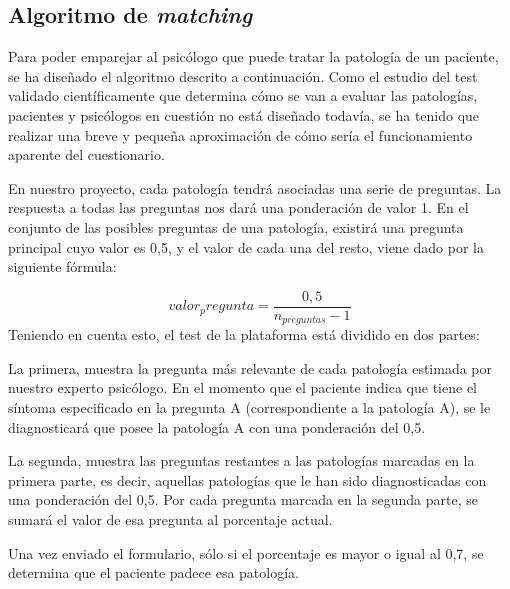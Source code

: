 
\subsection{Algoritmo de \textit{matching}}


Para poder emparejar al psicólogo que puede tratar la patología de un paciente, se ha diseñado el algoritmo descrito a continuación. Como el estudio del test validado científicamente que determina cómo se van a evaluar las patologías, pacientes y psicólogos en cuestión no está diseñado todavía, se ha tenido que realizar una breve y pequeña aproximación de cómo sería el funcionamiento aparente del cuestionario.


En nuestro proyecto, cada patología tendrá asociadas una serie de preguntas. La respuesta a todas las preguntas nos dará una ponderación de valor 1. En el conjunto de las posibles preguntas de una patología, existirá una pregunta principal cuyo valor es 0,5, y el valor de cada una del resto, viene dado por la siguiente fórmula:

\begin{equation}
valor_pregunta = \frac{0,5}{n_{preguntas}-1}
\label{mi_ecuacion}
\end{equation}
%
%
%
%
Teniendo en cuenta esto, el test de la plataforma está dividido en dos partes:


La primera, muestra la pregunta más relevante de cada patología estimada por nuestro experto psicólogo. En el momento que el paciente indica que tiene el síntoma especificado en la pregunta A (correspondiente a la patología A), se le diagnosticará que posee la patología A con una ponderación del 0,5.


La segunda, muestra las preguntas restantes a las patologías marcadas en la primera parte, es decir, aquellas patologías que le han sido diagnosticadas con una ponderación del 0,5. Por cada pregunta marcada en la segunda parte, se sumará el valor de esa pregunta al porcentaje actual.


Una vez enviado el formulario, sólo si el porcentaje es mayor o igual al 0,7, se determina que el paciente padece esa patología.


